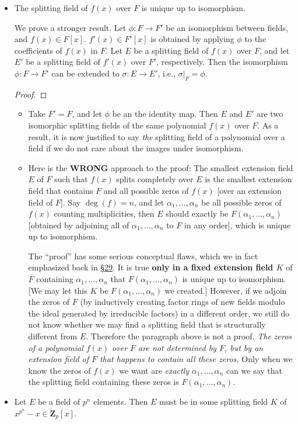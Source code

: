 \documentclass[11pt]{article}
\newcommand{\lk}[2]{\hyperlink{subsection.#1.#2}{\S#2}} %
\newcommand{\Z}{\mathbf{Z}}
\begin{document}
\begin{itemize}
    \item The splitting field of $f(x)$ over $F$ is unique up to isomorphism.
    
    We prove a stronger result. Let $\phi: F \to F'$ be an isomorphism between fields, and $f(x) \in F[x]$. $f'(x) \in F'[x]$ is obtained by applying $\phi$ to the coefficients of $f(x)$ in $F$. Let $E$ be a splitting field of $f(x)$ over $F$, and let $E'$ be a splitting field of $f'(x)$ over $F'$, respectively. Then the isomorphism $\phi: F \to F'$ can be extended to $\sigma: E \to E'$, i.e., $\sigma|_F = \phi$.
    \begin{proof}
        
    \end{proof}
    \begin{itemize}
        \item Take $F' = F$, and let $\phi$ be an the identity map. Then $E$ and $E'$ are two isomorphic splitting fields of the same polynomial $f(x)$ over $F$. As a result, it is now justified to say \emph{the} splitting field of a polynomial over a field if we do not care about the images under isomorphism.
        \item Here is the \textbf{WRONG} approach to the proof: The smallest extension field $E$ of $F$ such that $f(x)$ splits completely over $E$ is the smallest extension field that contains $F$ and all possible zeros of $f(x)$ [over an extension field of $F$]. Say $\deg(f) = n$, and let $\alpha_1,\dots,\alpha_n$ be all possible zeros of $f(x)$ counting multiplicities, then $E$ should exactly be $F(\alpha_1,\dots,\alpha_n)$ [obtained by adjoining all of $\alpha_1,\dots,\alpha_n$ to $F$ in any order], which is unique up to isomorphism.
        
        The ``proof'' has some serious conceptual flaws, which we in fact emphasized back in \lk{6}{29}. It is true \textbf{only in a fixed extension field $K$} of $F$ containing $\alpha_1,\dots,\alpha_n$ that $F(\alpha_1,\dots,\alpha_n)$ is unique up to isomorphism. [We may let this $K$ be $F(\alpha_1,\dots,\alpha_n)$ we created.] However, if we adjoin the zeros of $F$ (by inductively creating factor rings of new fields modulo the ideal generated by irreducible factors) in a different order, we still do not know whether we may find a splitting field that is structurally different from $E$. Therefore the paragraph above is not a proof. \emph{The zeros of a polynomial $f(x)$ over $F$ are not determined by $F$, but by an extension field of $F$ that happens to contain all these zeros.} Only when we know the zeros of $f(x)$ we want are \emph{exactly} $\alpha_1,\dots,\alpha_n$ can we say that the splitting field containing these zeros is $F(\alpha_1,\dots,\alpha_n)$.
    \end{itemize}
    \item Let $E$ be a field of $p^n$ elements. Then $E$ must be in some splitting field $K$ of $x^{p^n}-x \in \Z_p[x]$.


\end{itemize}
\end{document}
